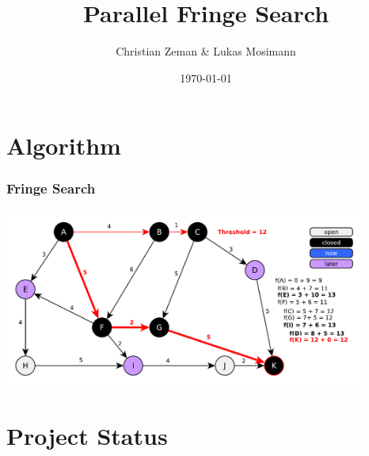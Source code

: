 \documentclass{beamer}
\title[Parallel Fringe Search]{Parallel Fringe Search} %
\author{Christian Zeman \& Lukas Mosimann} %
\institute[ETH] %
{
ETH Zürich \\ %
\medskip
\textit{Design of Parallel and High-Performance Computing} %
}
\date{\today} %
\begin{document}
\begin{frame}
\titlepage %
\end{frame}



\section{Algorithm} %

\begin{frame}
\frametitle{Fringe Search}
\includegraphics[height=165pt]{fringe7.pdf}
\end{frame}

\section{Project Status}
\end{document}
